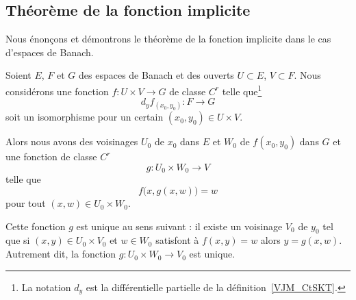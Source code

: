\subsection{Théorème de la fonction implicite}

Nous énonçons et démontrons le théorème de la fonction implicite dans le cas d'espaces de Banach.
\begin{theorem} \label{ThoAcaWho}
	Soient \( E\), \( F\) et \( G\) des espaces de Banach et des ouverts \( U\subset E\), \( V\subset F\). Nous considérons une fonction \( f\colon U\times V\to G\) de classe \( C^r\) telle que\footnote{La notation \( d_y\) est la différentielle partielle de la définition~\ref{VJM_CtSKT}.}
	\begin{equation}
		d_yf_{(x_0,y_0)}\colon F\to G
	\end{equation}
	soit un isomorphisme pour un certain \( (x_0,y_0)\in U\times V\).

	Alors nous avons des voisinages \( U_0\) de \( x_0\) dans \( E\) et \( W_0\) de \( f(x_0,y_0)\) dans \( G\) et une fonction de classe \( C^r\)
	\begin{equation}
		g\colon U_0\times W_0\to V
	\end{equation}
	telle que
	\begin{equation}
		f\big( x,g(x,w) \big)=w
	\end{equation}
	pour tout \( (x,w)\in U_0\times W_0\).

	Cette fonction \( g\) est unique au sens suivant : il existe un voisinage \( V_0 \) de \( y_0\) tel que si \( (x,y)\in U_0\times V_0\) et \( w\in W_0\) satisfont à \( f(x,y)=w\) alors \( y=g(x,w)\). Autrement dit, la fonction \( g\colon U_0\times W_0\to V_0\) est unique.
\end{theorem}

